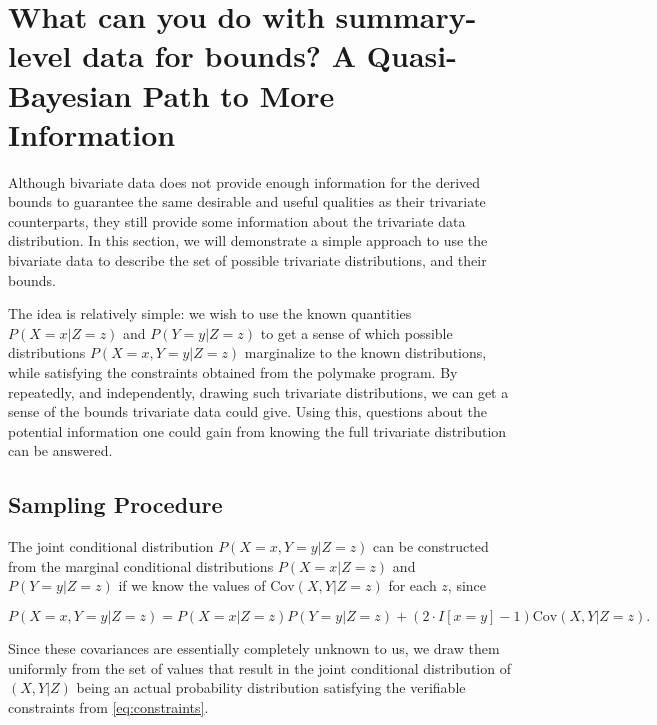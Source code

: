 \documentclass[
]{article}
\theoremstyle{plain}
\begin{document}
\hypertarget{what-can-you-do-with-summary-level-data-for-bounds-a-quasi-bayesian-path-to-more-information}{%
\section{What can you do with summary-level data for bounds? A Quasi-Bayesian Path to More Information}\label{what-can-you-do-with-summary-level-data-for-bounds-a-quasi-bayesian-path-to-more-information}}

\label{quasi-bayesian}

Although bivariate data does not provide enough information for the derived bounds to guarantee the same desirable and useful qualities as their trivariate counterparts, they still provide some information about the trivariate data distribution. In this section, we will demonstrate a simple approach to use the bivariate data to describe the set of possible trivariate distributions, and their bounds.

The idea is relatively simple: we wish to use the known quantities \(P(X = x | Z = z)\) and \(P(Y = y | Z = z)\) to get a sense of which possible distributions \(P(X = x, Y = y | Z = z)\) marginalize to the known distributions, while satisfying the constraints obtained from the polymake program. By repeatedly, and independently, drawing such trivariate distributions, we can get a sense of the bounds trivariate data could give. Using this, questions about the potential information one could gain from knowing the full trivariate distribution can be answered.

\hypertarget{sampling-procedure}{%
\subsection{Sampling Procedure}\label{sampling-procedure}}

The joint conditional distribution \(P(X = x, Y = y | Z = z)\) can be constructed from the marginal conditional distributions \(P(X = x | Z = z)\) and \(P(Y = y | Z = z)\) if we know the values of \(\text{Cov}(X, Y | Z = z)\) for each \(z\), since

\begin{equation}
P(X = x, Y = y | Z = z) = P(X = x | Z = z)P(Y = y | Z = z) + (2\cdot I[x = y] - 1)\text{Cov}(X, Y | Z = z). \label{eq:cov-expression}
\end{equation}

Since these covariances are essentially completely unknown to us, we draw them uniformly from the set of values that result in the joint conditional distribution of \((X,Y|Z)\) being an actual probability distribution satisfying the verifiable constraints from \eqref{eq:constraints}.
\end{document}
